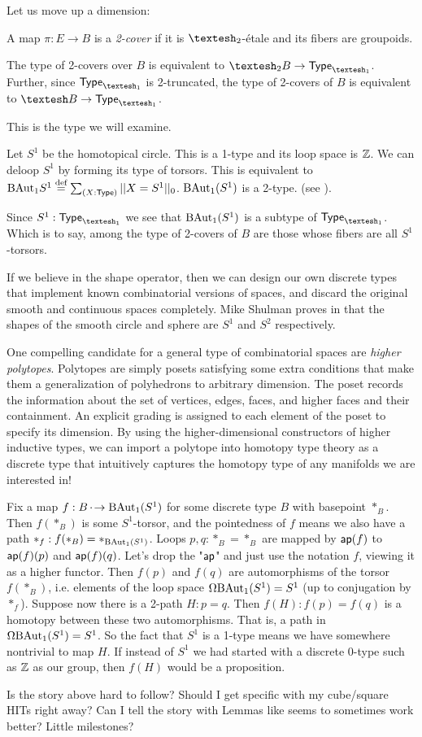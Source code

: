 \documentclass[12pt]{article}
\begin{document}
Let us move up a dimension:

\begin{mydef}
  A map \(\pi:E\to B\) is a \emph{2-cover} if it is \(\shapet\)-étale and its fibers are groupoids.
\end{mydef}

\begin{mylemma}
  The type of 2-covers over \(B\) is equivalent to \(\shapet B \to \Typeo\). Further, since \(\Typeo\) is 2-truncated, the type of 2-covers of \(B\) is equivalent to \(\shape B\to \Typeo\).
\end{mylemma}

This is the type we will examine.

Let \(S^1\) be the homotopical circle. This is a 1-type and its loop space is \(\mathbb{Z}\). We can deloop \(S^1\) by forming its type of torsors. This is equivalent to \(\mathrm{BAut}_1 S^1\stackrel{\textup{def}}{=}\sum_{(X:\mathsf{Type})}||X=S^1||_0\). \(\mathrm{BAut}_1(S^1)\) is a 2-type. (see \cite{buchholtz2023central}).

Since \(S^1:\Typeo\) we see that \(\mathrm{BAut}_1(S^1)\) is a subtype of \(\Typeo\). Which is to say, among the type of 2-covers of \(B\) are those whose fibers are all \(S^1\)-torsors.

If we believe in the shape operator, then we can design our own discrete types that implement known combinatorial versions of spaces, and discard the original smooth and continuous spaces completely. Mike Shulman proves in \cite{shulman_cohesion} that the shapes of the smooth circle and sphere are \(S^1\) and \(S^2\) respectively.

One compelling candidate for a general type of combinatorial spaces are \emph{higher polytopes}. Polytopes are simply posets satisfying some extra conditions that make them a generalization of polyhedrons to arbitrary dimension. The poset records the information about the set of vertices, edges, faces, and higher faces and their containment. An explicit grading is assigned to each element of the poset to specify its dimension. By using the higher-dimensional constructors of higher inductive types, we can import a polytope into homotopy type theory as a discrete type that intuitively captures the homotopy type of any manifolds we are interested in!

Fix a map \( f:B\,\cdot\!\to \mathrm{BAut}_1(S^1) \) for some discrete type \( B \) with basepoint \( *_B \). Then \( f(*_B) \) is some \( S^1 \)-torsor, and the pointedness of \( f \) means we also have a path \( *_f:f(*_B)=*_{\mathrm{BAut}_1(S^1)} \). Loops \( p,q:*_B=*_B \) are mapped by \( \textsf{ap}(f) \) to \( \textsf{ap}(f)(p)\) and \( \textsf{ap}(f)(q) \). Let's drop the "\( \textsf{ap} \)" and just use the notation \( f \), viewing it as a higher functor. Then \( f(p) \) and \( f(q) \) are automorphisms of the torsor \( f(*_B) \), i.e. elements of the loop space \( \Omega\mathrm{BAut}_1(S^1)=S^1 \) (up to conjugation by \( *_f \)). Suppose now there is a 2-path \( H:p=q \). Then \( f(H):f(p)=f(q) \) is a homotopy between these two automorphisms. That is, a path in \( \Omega\mathrm{BAut}_1(S^1)=S^1 \). So the fact that \( S^1 \) is a 1-type means we have somewhere nontrivial to map \( H \). If instead of \( S^1 \) we had started with a discrete 0-type such as \( \mathbb{Z} \) as our group, then \( f(H) \) would be a proposition.

Is the story above hard to follow? Should I get specific with my cube/square HITs right away? Can I tell the story with Lemmas like seems to sometimes work better? Little milestones?


\end{document}
